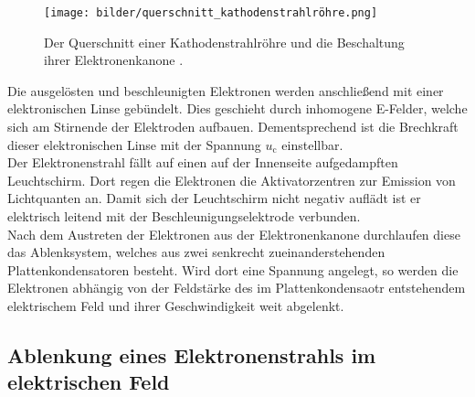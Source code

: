    \begin{figure}[H]
        \centering
        \texttt{[image: bilder/querschnitt\_kathodenstrahlröhre.png]}
        \caption{Der Querschnitt einer Kathodenstrahlröhre und die Beschaltung ihrer Elektronenkanone \cite{anleitung501}.}
        \label{fig:querschnitt_kathodenstrahlroehre}
    \end{figure}

    \noindent Die ausgelösten und beschleunigten Elektronen werden anschließend mit einer elektronischen Linse gebündelt. Dies geschieht durch inhomogene E-Felder, 
    welche sich am Stirnende der Elektroden aufbauen. Dementsprechend ist die Brechkraft dieser elektronischen Linse mit der Spannung $u_{\text{c}}$ einstellbar.\\
    Der Elektronenstrahl fällt auf einen auf der Innenseite aufgedampften Leuchtschirm. Dort regen die Elektronen die Aktivatorzentren zur Emission von
    Lichtquanten an. Damit sich der Leuchtschirm nicht negativ auflädt ist er elektrisch leitend mit der Beschleunigungselektrode verbunden. \\
    Nach dem Austreten der Elektronen aus der Elektronenkanone durchlaufen diese das Ablenksystem, welches aus zwei senkrecht zueinanderstehenden
    Plattenkondensatoren besteht. Wird dort eine Spannung angelegt, so werden die Elektronen abhängig von der Feldstärke des im Plattenkondensaotr entstehendem 
    elektrischem Feld und ihrer Geschwindigkeit weit abgelenkt. 

\subsection{Ablenkung eines Elektronenstrahls im elektrischen Feld}

